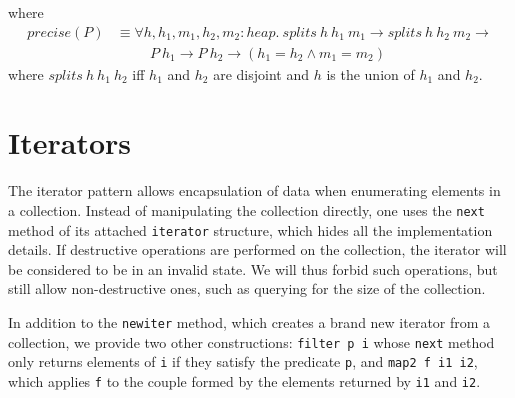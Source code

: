 \documentclass[a4paper,english]{article}
\newcommand{\HEAP}[0]{heap}
\begin{document}
where
\begin{align*}
precise(P) &\equiv \forall h, h_1, m_1, h_2, m_2 : \HEAP.\ splits\ h\ h_1\ m_1 \rightarrow splits\ h\ h_2\ m_2 \rightarrow\\
&\quad\quad\ \ P\ h_1 \rightarrow P\ h_2 \rightarrow (h_1 = h_2 \land m_1 = m_2)
\end{align*}
where $splits\ h\ h_1\ h_2$ iff $h_1$ and $h_2$ are disjoint and $h$ is the
union of $h_1$ and $h_2$.

\section{Iterators}

The iterator pattern allows encapsulation of data when enumerating elements in
a collection. Instead of manipulating the collection directly, one uses the
\texttt{next} method of its attached \texttt{iterator} structure, which hides
all the implementation details. If destructive operations are performed on the
collection, the iterator will be considered to be in an invalid state. We will
thus forbid such operations, but still allow non-destructive ones, such as
querying for the size of the collection.

In addition to the \texttt{newiter} method, which creates a brand new iterator
from a collection, we provide two other constructions: \texttt{filter p i}
whose \texttt{next} method only returns elements of \texttt{i} if they satisfy
the predicate \texttt{p}, and \texttt{map2 f i1 i2}, which applies \texttt{f}
to the couple formed by the elements returned by \texttt{i1} and \texttt{i2}.
\end{document}
